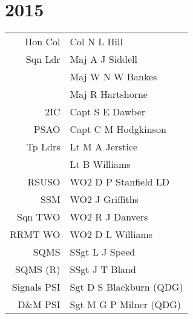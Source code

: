 \chapter*{2015}

\begin{center}
  \small
  \begin{tabular}{rl}
    Hon Col & Col N L Hill \\
    Sqn Ldr & Maj A J Siddell \\
      & Maj W N W Bankes \\
      & Maj R Hartshorne \\
    2IC & Capt S E Dawber \\
    PSAO & Capt C M Hodgkinson \\
    Tp Ldrs & Lt M A  Jerstice \\
     & Lt B Williams \\
    RSUSO & WO2 D P Stanfield LD \\
    SSM & WO2 J Griffiths \\
    Sqn TWO & WO2 R J Danvers \\
    RRMT WO & WO2 D L Williams \\
    SQMS & SSgt L J Speed \\
    SQMS (R) & SSgt J T Bland \\
    Signals PSI & Sgt D S Blackburn (QDG) \\
    D\&M PSI & Sgt M G P Milner (QDG) \\
  \end{tabular}
\end{center}

